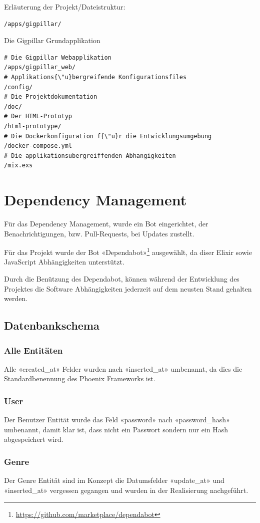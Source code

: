 \noindent
Erläuterung der Projekt/Dateistruktur:

\begin{lstlisting}[frame=single]
/apps/gigpillar/
\end{lstlisting}
Die Gigpillar Grundapplikation

\begin{lstlisting}[frame=single]
# Die Gigpillar Webapplikation
/apps/gigpillar_web/
# Applikations{\"u}bergreifende Konfigurationsfiles
/config/
# Die Projektdokumentation
/doc/
# Der HTML-Prototyp
/html-prototype/
# Die Dockerkonfiguration f{\"u}r die Entwicklungsumgebung
/docker-compose.yml
# Die applikationsubergreiffenden Abhangigkeiten
/mix.exs
\end{lstlisting}

\section{Dependency Management}

Für das Dependency Management, wurde ein Bot eingerichtet, der
Benachrichtigungen, bzw. Pull-Requests, bei Updates zustellt.

Für das Projekt wurde der Bot «Dependabot»\footnote{\url{https://github.com/marketplace/dependabot}} ausgewählt, da diser Elixir sowie JavaScript Abhängigkeiten unterstützt.

Durch die Benützung des Dependabot, können während der Entwicklung des Projektes
die Software Abhängigkeiten jederzeit auf dem neusten Stand gehalten werden.

\clearpage
\subsection{Datenbankschema}

\subsubsection{Alle Entitäten}
Alle «created\_at» Felder wurden nach «inserted\_at» umbenannt, da dies die
Standardbenennung des Phoenix Frameworks ist.

\subsubsection{User}
Der Benutzer Entität wurde das Feld «password» nach «password\_hash» umbenannt,
damit klar ist, dass nicht ein Passwort sondern nur ein Hash abgespeichert wird.

\subsubsection{Genre}
Der Genre Entität sind im Konzept die Datumsfelder «update\_at» und «inserted\_at»
vergessen gegangen und wurden in der Realisierung nachgeführt.

